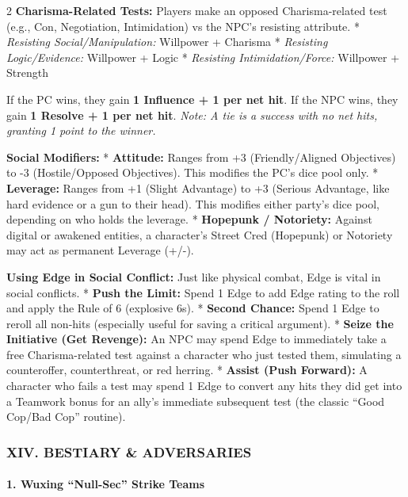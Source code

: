 \documentclass[
  oneside]{article}
\begin{document}
\begin{multicols}{2}
\textbf{Charisma-Related Tests:} Players make an
opposed Charisma-related test (e.g., Con,
Negotiation, Intimidation) vs the NPC's resisting
attribute. * \emph{Resisting Social/Manipulation:}
Willpower + Charisma * \emph{Resisting
Logic/Evidence:} Willpower + Logic *
\emph{Resisting Intimidation/Force:} Willpower +
Strength

If the PC wins, they gain \textbf{1 Influence + 1
per net hit}. If the NPC wins, they gain \textbf{1
Resolve + 1 per net hit}. \emph{Note: A tie is a
success with no net hits, granting 1 point to the
winner.}

\textbf{Social Modifiers:} * \textbf{Attitude:}
Ranges from +3 (Friendly/Aligned Objectives) to -3
(Hostile/Opposed Objectives). This modifies the
PC's dice pool only. * \textbf{Leverage:} Ranges
from +1 (Slight Advantage) to +3 (Serious
Advantage, like hard evidence or a gun to their
head). This modifies either party's dice pool,
depending on who holds the leverage. *
\textbf{Hopepunk / Notoriety:} Against digital or
awakened entities, a character's Street Cred
(Hopepunk) or Notoriety may act as permanent
Leverage (+/-).

\textbf{Using Edge in Social Conflict:} Just like
physical combat, Edge is vital in social
conflicts. * \textbf{Push the Limit:} Spend 1 Edge
to add Edge rating to the roll and apply the Rule
of 6 (explosive 6s). * \textbf{Second Chance:}
Spend 1 Edge to reroll all non-hits (especially
useful for saving a critical argument). *
\textbf{Seize the Initiative (Get Revenge):} An
NPC may spend Edge to immediately take a free
Charisma-related test against a character who just
tested them, simulating a counteroffer,
counterthreat, or red herring. * \textbf{Assist
(Push Forward):} A character who fails a test may
spend 1 Edge to convert any hits they did get into
a Teamwork bonus for an ally's immediate
subsequent test (the classic ``Good Cop/Bad Cop''
routine).

\hypertarget{xiv.-bestiary-adversaries}{%
\subsubsection{XIV. BESTIARY \&
ADVERSARIES}\label{xiv.-bestiary-adversaries}}

\hypertarget{wuxing-null-sec-strike-teams}{%
\paragraph{1. Wuxing ``Null-Sec'' Strike
Teams}\label{wuxing-null-sec-strike-teams}}


\end{multicols}
\end{document}
